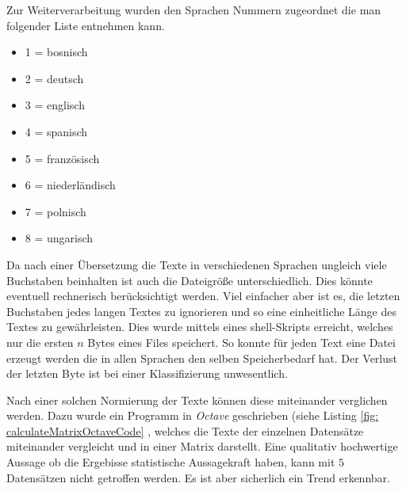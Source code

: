 \documentclass[12pt,german]{article}
\begin{document}
Zur Weiterverarbeitung wurden den Sprachen Nummern zugeordnet die man folgender Liste entnehmen kann.

\begin{itemize}
	\item 1 = bosnisch
	\item 2 = deutsch
	\item 3 = englisch
	\item 4 = spanisch
	\item 5 = französisch
	\item 6 = niederländisch
	\item 7 = polnisch
	\item 8 = ungarisch
\end{itemize}

Da nach einer Übersetzung die Texte in verschiedenen Sprachen ungleich viele Buchstaben beinhalten ist auch die Dateigröße unterschiedlich. Dies könnte eventuell rechnerisch berücksichtigt werden. Viel einfacher aber ist es, die letzten Buchstaben jedes langen Textes zu ignorieren und so eine einheitliche Länge des Textes zu gewährleisten. Dies wurde mittels eines shell-Skripts erreicht, welches nur die ersten $n$ Bytes eines Files speichert. So konnte für jeden Text eine Datei erzeugt werden die in allen Sprachen den selben Speicherbedarf hat. Der Verlust der letzten Byte ist bei einer Klassifizierung unwesentlich. 



Nach einer solchen Normierung der Texte können diese miteinander verglichen werden. Dazu wurde ein Programm in \textit{Octave} geschrieben (siehe Listing \ref{fig: calculateMatrixOctaveCode}  , welches die Texte der einzelnen Datensätze miteinander vergleicht und in einer Matrix darstellt. Eine qualitativ hochwertige Aussage ob die Ergebisse statistische Aussagekraft haben, kann mit $5$ Datensätzen nicht getroffen werden. Es ist aber sicherlich ein Trend erkennbar.
\end{document}
